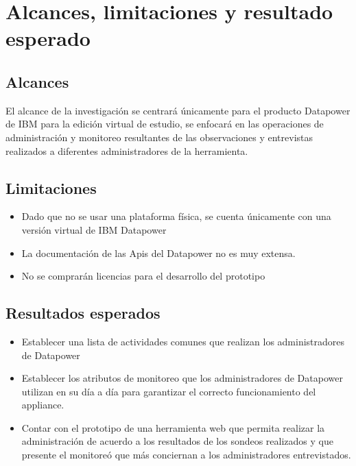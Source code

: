 \section{Alcances, limitaciones y resultado esperado}
\subsection{Alcances}
El alcance de la investigación se centrará únicamente para el producto Datapower de IBM para la edición virtual de estudio, se enfocará en las operaciones de administración y monitoreo resultantes de las observaciones y entrevistas realizados a diferentes administradores de la herramienta.
\newline
\subsection{Limitaciones}
\begin{itemize}
  \item Dado que no se usar una plataforma física, se cuenta únicamente con una versión virtual de IBM Datapower
  \item La documentación de las Apis del Datapower no es muy extensa.
  \item No se comprarán licencias para el desarrollo del prototipo
\end{itemize}   
\subsection{Resultados esperados}
\begin{itemize}
  \item Establecer una lista de actividades comunes que realizan los administradores de Datapower
  \item Establecer los atributos de monitoreo que los administradores de Datapower utilizan en su día a día para garantizar el correcto funcionamiento del appliance.
  \item Contar con el prototipo de una herramienta web que permita realizar la administración de acuerdo a los resultados de los sondeos realizados y que presente el monitoreó que más conciernan a los administradores entrevistados.  
\end{itemize}
\newpage